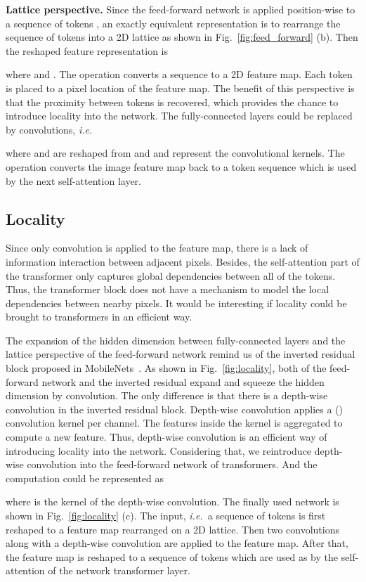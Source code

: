 \documentclass[10pt,twocolumn,letterpaper]{article}
\def\ie{\emph{i.e.\ }}
\begin{document}
\textbf{Lattice perspective.} Since the feed-forward network is applied position-wise to a sequence of tokens , an exactly equivalent representation is to rearrange the sequence of tokens into a 2D lattice as shown in Fig.~\ref{fig:feed_forward} (b). Then the reshaped feature representation is 

where  and .
The operation  converts a sequence to a 2D feature map.
Each token is placed to a pixel location of the feature map.
The benefit of this perspective is that the proximity between tokens is recovered, which provides the chance to introduce locality into the network. The fully-connected layers could be replaced by  convolutions, \ie

where  and  are reshaped from  and  and represent the convolutional kernels. The operation  converts the image feature map back to a token sequence which is used by the next self-attention layer.

\subsection{Locality}
\label{subsec:locality}

Since only  convolution is applied to the feature map, there is a lack of information interaction between adjacent pixels. Besides, the self-attention part of the transformer only captures global dependencies between all of the tokens. Thus, the transformer block does not have a mechanism to model the local dependencies between nearby pixels. It would be interesting if locality could be brought to transformers in an efficient way. 

The expansion of the hidden dimension between fully-connected layers and the lattice perspective of the feed-forward network remind us of the inverted residual block proposed in MobileNets~\cite{sandler2018mobilenetv2,howard2019searching}. As shown in Fig.~\ref{fig:locality}, both of the feed-forward network and the inverted residual expand and squeeze the hidden dimension by  convolution. The only difference is that there is a depth-wise convolution in the inverted residual block. Depth-wise convolution applies a  () convolution kernel per channel. The features inside the  kernel is aggregated to compute a new feature. Thus, depth-wise convolution is an efficient way of introducing locality into the network. Considering that, we reintroduce depth-wise convolution into the feed-forward network of transformers. And the computation could be represented as   

where  is the kernel of the depth-wise convolution. The finally used network is shown in Fig.~\ref{fig:locality} (c). The input, \ie a sequence of tokens is first reshaped to a feature map rearranged on a 2D lattice. Then two  convolutions along with a depth-wise convolution are applied to the feature map. After that, the feature map is reshaped to a sequence of tokens which are used as by the self-attention of the network transformer layer.
\end{document}
